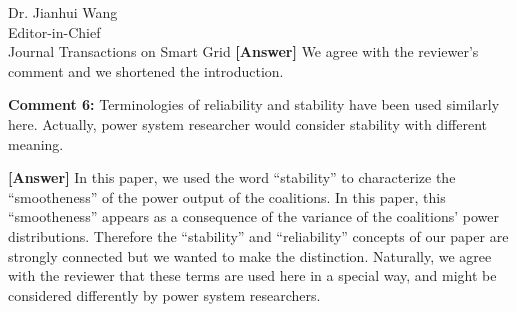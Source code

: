 \documentclass{letter}
\begin{document}
\begin{letter}{Dr. Jianhui Wang \\ Editor-in-Chief \\ Journal Transactions on Smart Grid }
\textbf{[Answer]} We agree with the reviewer’s comment and we shortened the introduction.


\textbf{Comment 6:} Terminologies of reliability and stability have been used similarly here. Actually, power system researcher would consider stability with different meaning.


\textbf{[Answer]} In this paper, we used the word “stability” to characterize the “smootheness” of the power output of the coalitions. In this paper, this “smootheness” appears as a consequence of the variance of the coalitions’ power distributions. Therefore the “stability” and “reliability” concepts of our paper are strongly connected but we wanted to make the distinction. Naturally, we agree with the reviewer that these terms are used here in a special way, and might be considered differently by power system researchers.




\end{letter}
\end{document}
